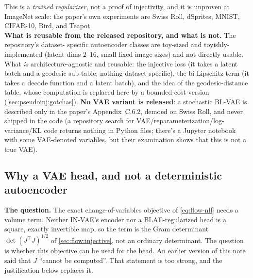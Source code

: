 This is a \emph{trained regularizer}, not a proof of injectivity, and it is unproven at ImageNet 
scale: the paper's own experiments are Swiss Roll, dSprites, MNIST, CIFAR-10, Bird, and Teapot.\\

\textbf{What is reusable from the released repository, and what is not.} The repository's dataset-
specific autoencoder classes are toy-sized and toyishly-implemented (latent dims $2$--$16$, small 
fixed image sizes) and not directly usable.
What \emph{is} architecture-agnostic and reusable: the injective loss (it takes a latent batch and a
geodesic sub-table, nothing dataset-specific), the bi-Lipschitz term (it takes a decode function and a
latent batch), and the idea of the geodesic-distance table, whose computation is replaced here by a
bounded-cost version (\cref{sec:pseudoinj:gotchas}). \textbf{No VAE variant is released}: a stochastic BL-VAE is 
described only in the paper's Appendix~C.6.2, demoed on Swiss Roll, and never shipped in the code 
(a repository search for VAE/reparameterization/log-variance/KL code returns nothing in Python 
files; there's a Jupyter notebook with some VAE-denoted variables, but their examination shows that 
this is not a true VAE).

\subsection{Why a VAE head, and not a deterministic autoencoder}
\label{sec:pseudoinj:jacobian}
\textbf{The question.} The exact change-of-variables objective of \cref{eq:flow-nll} needs a volume
term. Neither IN-VAE's encoder nor a BLAE-regularized head is a square, exactly invertible map, so the
term is the Gram determinant $\det(J^\top J)^{1/2}$ of \cref{sec:flow:injective}, not an ordinary
determinant. The question is whether this objective can be used for the head. An earlier version of this
note said that $J$ ``cannot be computed''. That statement is too strong, and the justification below
replaces it.

